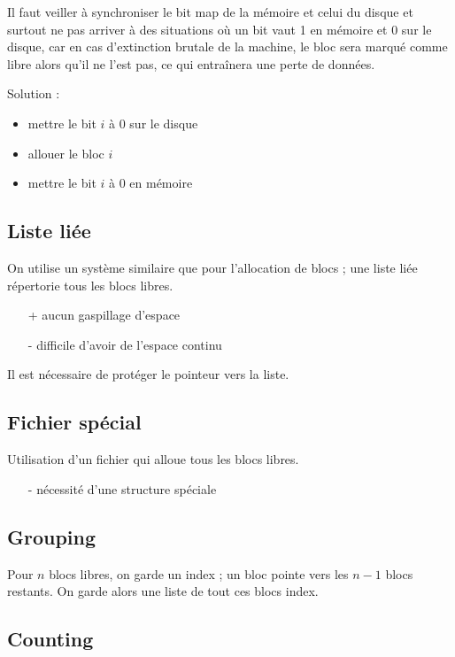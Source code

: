 	Il faut veiller à synchroniser le bit map de la mémoire et celui du disque et surtout ne pas arriver à des situations où un bit vaut 1 en mémoire et 0 sur le disque, car en cas d'extinction brutale de la machine, le bloc sera marqué comme libre alors qu'il ne l'est pas, ce qui entraînera une perte de données.
	
	Solution :
	
	\begin{itemize}
		\item mettre le bit $i$ à 0 sur le disque
		\item allouer le bloc $i$
		\item mettre le bit $i$ à 0 en mémoire
	\end{itemize}
	
	\subsection{Liste liée}
	
	On utilise un système similaire que pour l'allocation de blocs ; une liste liée répertorie tous les blocs libres.
	
	\begin{itemize}
		\item[+] aucun gaspillage d'espace
		\item[-] difficile d'avoir de l'espace continu
	\end{itemize}
	
	Il est nécessaire de protéger le pointeur vers la liste.
	
	\subsection{Fichier spécial}
	
	Utilisation d'un fichier qui alloue tous les blocs libres.
	
	\begin{itemize}
		\item[-] nécessité d'une structure spéciale
	\end{itemize}
	
	\subsection{Grouping}
	
	Pour $n$ blocs libres, on garde un index ; un bloc pointe vers les $n - 1$ blocs restants. On garde alors une liste de tout ces blocs index.
	
	\subsection{Counting}
	
